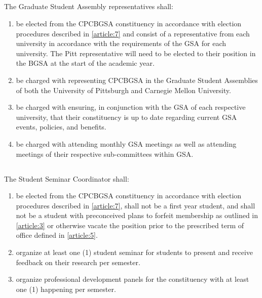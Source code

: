 \documentclass[11pt,a4paper]{article}
\begin{document}
\subsection{} The Graduate Student Assembly representatives shall:
\begin{enumerate}        
	\item be elected from the CPCBGSA constituency in accordance with election procedures described in \cref{article:7} and consist of a representative from each university in accordance with the requirements of the GSA for each university. The Pitt representative will need to be elected to their position in the BGSA at the start of the academic year.
	\item be charged with representing CPCBGSA in the Graduate Student Assemblies of both the University of Pittsburgh and Carnegie Mellon University.
	\item be charged with ensuring, in conjunction with the GSA of each respective university, that their constituency is up to date regarding current GSA events, policies, and benefits.
	\item be charged with attending monthly GSA meetings as well as attending meetings of their respective sub-committees within GSA.
\end{enumerate}   

\subsection{} The Student Seminar Coordinator shall:
\begin{enumerate}        
	\item be elected from the CPCBGSA constituency in accordance with election procedures described in \cref{article:7}, shall not be a first year student, and shall not be a student with preconceived plans to forfeit membership as outlined in \cref{article:3} or otherwise vacate the position prior to the prescribed term of office defined in \cref{article:5}.
	\item organize at least one (1) student seminar for students to present and receive feedback on their research per semester.
	\item organize professional development panels for the constituency with at least one (1) happening per semester.
\end{enumerate}            
\end{document}
